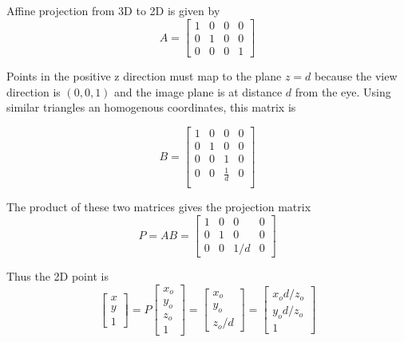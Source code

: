 \documentclass[a4paper,10pt]{scrartcl}
\begin{document}
\subsection{}            

Affine projection from 3D to 2D is given by \[A = \begin{bmatrix} 1 & 0 & 0 & 0 \\ 0 & 1 & 0 & 0 \\ 0 & 0 & 0 & 1 \end{bmatrix}\]

Points in the positive z direction must map to the plane $z = d$ because the view direction is $(0, 0, 1)$ and the image plane is at distance $d$ from the eye.
Using similar triangles an homogenous coordinates, this matrix is

\[ B =\begin{bmatrix}1 & 0 & 0 & 0\\
    0 & 1 & 0 & 0 \\
    0 & 0 & 1 & 0 \\
    0 & 0 & \frac{1}{d} & 0 \\
\end{bmatrix}\]
            
The product of these two matrices gives the projection matrix \[ P = AB = \begin{bmatrix} 1 & 0 & 0 & 0 \\ 0 & 1 & 0 & 0 \\ 0 & 0 & 1/d & 0 \end{bmatrix}\] 

Thus the 2D point is \[ \begin{bmatrix} x \\ y \\ 1\end{bmatrix} = P \begin{bmatrix} x_o \\ y_o \\ z_o \\ 1\end{bmatrix} = \begin{bmatrix} x_o \\ y_o \\ z_o/d\end{bmatrix} = \begin{bmatrix}x_od/z_o \\ y_od/z_o \\ 1\end{bmatrix}\]


\subsection{}
\end{document}
